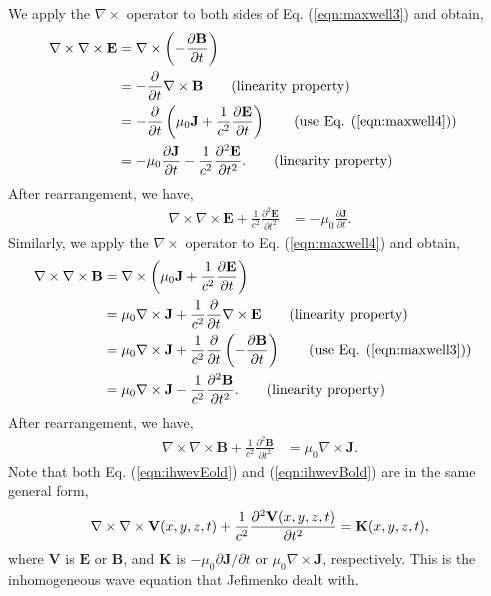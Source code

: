 \documentclass[11pt]{article}              %
\begin{document}
We apply the $\nabla\times$ operator to both sides of Eq. (\ref{eqn:maxwell3}) and obtain,
\begin{align}
    \nabla\times\nabla\times{\mathbf E}&=\nabla\times\left(-\frac{\partial {\mathbf B}}{\partial t}\right)&\notag\\
    &=-\frac{\partial }{\partial t}\nabla\times{\mathbf B}\tag{linearity property}\\
    &=-\frac{\partial}{\partial t}\left(\mu_0{\mathbf J}+\frac{1}{c^2}\frac{\partial{\mathbf E}}{\partial t}\right)\tag{use Eq. (\ref{eqn:maxwell4})}\\
    &=-\mu_0\frac{\partial{\mathbf J}}{\partial t}-\frac{1}{c^2}\frac{\partial^2{\mathbf E}}{\partial t^2}.\tag{linearity property}
\end{align}
After rearrangement, we have,
\begin{align}
    \nabla\times\nabla\times{\mathbf E}+\frac{1}{c^2}\frac{\partial^2{\mathbf E}}{\partial t^2}&=-\mu_0\frac{\partial {\mathbf J}}{\partial t}.\label{eqn:ihwevEold}
\end{align}
Similarly, we apply the $\nabla\times$ operator to Eq. (\ref{eqn:maxwell4}) and obtain,
\begin{align}
    \nabla\times\nabla\times{\mathbf B}&=\nabla\times \left(\mu_0{\mathbf J}+\frac{1}{c^2}\frac{\partial {\mathbf E}}{\partial t}\right)&\notag\\
    &=\mu_0\nabla\times {\mathbf J}+\frac{1}{c^2}\frac{\partial }{\partial t}\nabla\times{\mathbf E}\tag{linearity property}\\
    &=\mu_0\nabla\times {\mathbf J}+\frac{1}{c^2}\frac{\partial}{\partial t}\left(-\frac{\partial{\mathbf B}}{\partial t}\right)\tag{use Eq. (\ref{eqn:maxwell3})}\\
    &=\mu_0\nabla\times {\mathbf J}-\frac{1}{c^2}\frac{\partial^2{\mathbf B}}{\partial t^2}.\tag{linearity property}\
\end{align}
After rearrangement, we have,
\begin{align}
    \nabla\times\nabla\times{\mathbf B}+\frac{1}{c^2}\frac{\partial^2{\mathbf B}}{\partial t^2}&=\mu_0\nabla\times {\mathbf J}.\label{eqn:ihwevBold}
\end{align}
Note that both Eq. (\ref{eqn:ihwevEold}) and (\ref{eqn:ihwevBold}) are in the same general form,
\begin{align}
	\nabla\times\nabla\times {\mathbf V}(x,y,z,t) +\frac{1}{c^2}\frac{\partial^2 {\mathbf V}(x,y,z,t)}{\partial t^2}={\mathbf K}(x,y,z,t),\notag
\end{align}
where ${\mathbf V}$ is $\mathbf E$ or $\mathbf B$, and ${\mathbf K}$ is $-\mu_0{\partial {\mathbf J}}/{\partial t}$ or $\mu_0\nabla\times {\mathbf J}$, respectively. This is the inhomogeneous wave equation that Jefimenko dealt with.
\end{document}
